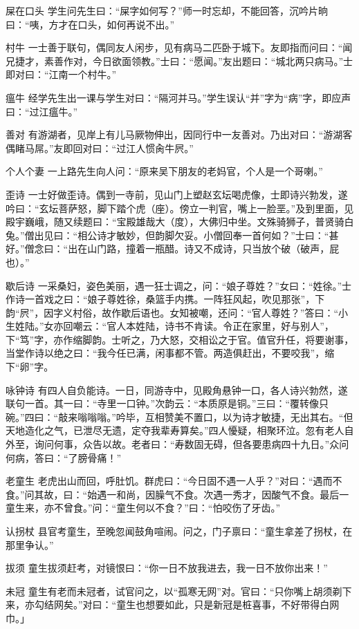 \documentclass[12pt,UTF8]{ctexbook}
\begin{document}
屎在口头
学生问先生曰：“屎字如何写？”师一时忘却，不能回答，沉吟片晌曰：“咦，方才在口头，如何再说不出。”

村牛
一士善于联句，偶同友人闲步，见有病马二匹卧于城下。友即指而问曰：“闻兄捷才，素善作对，今日欲面领教。”士曰：“愿闻。”友出题曰：“城北两只病马。”士即对曰：“江南一个村牛。”

瘟牛
经学先生出一课与学生对曰：“隔河并马。”学生误认“并”字为“病”字，即应声曰：“过江瘟牛。”

善对
有游湖者，见岸上有儿马厥物伸出，因同行中一友善对。乃出对曰：“游湖客偶睹马屌。”友即回对曰：“过江人惯肏牛屄。”

个人个妻
一上路先生向人问：“原来吴下朋友的老妈官，个人是一个哥喇。”

歪诗
一士好做歪诗。偶到一寺前，见山门上塑赵玄坛喝虎像，士即诗兴勃发，遂吟曰：“玄坛菩萨怒，脚下踏个虎（座）。傍立一判官，嘴上一脸垩。”及到里面，见殿宇巍峨，随又续题曰：“宝殿雄哉大（度），大佛归中坐。文殊骑狮子，普贤骑白兔。”僧出见曰：“相公诗才敏妙，但韵脚欠妥。小僧回奉一首何如？”士曰：“甚好。”僧念曰：“出在山门路，撞着一瓶醋。诗又不成诗，只当放个破（破声，屁也）。”

歇后诗
一采桑妇，姿色美丽，遇一狂士调之，问：“娘子尊姓？”女曰：“姓徐。”士作诗一首戏之曰：“娘子尊姓徐，桑篮手内携。一阵狂风起，吹见那张”，下韵“屄”，因字义村俗，故作歇后语也。女知被嘲，还问：“官人尊姓？”答曰：“小生姓陆。”女亦回嘲云：“官人本姓陆，诗书不肯读。令正在家里，好与别人”，下“笃”字，亦作缩脚韵。士听之，乃大怒，交相讼之于官。值官升任，将要谢事，当堂作诗以绝之曰：“我今任已满，闲事都不管。两造俱赶出，不要咬我”，缩下“卵”字。

咏钟诗
有四人自负能诗。一日，同游寺中，见殿角悬钟一口，各人诗兴勃然，遂联句一首。其一曰：“寺里一口钟。”次韵云：“本质原是铜。”三曰：“覆转像只碗。”四曰：“敲来嗡嗡嗡。”吟毕，互相赞美不置口，以为诗才敏捷，无出其右。“但天地造化之气，已泄尽无遗，定夺我辈寿算矣。”四人懮疑，相聚环泣。忽有老人自外至，询问何事，众告以故。老者曰：“寿数固无碍，但各要患病四十九日。”众问何病，答曰：“了膀骨痛！”

老童生
老虎出山而回，呼肚饥。群虎曰：“今日固不遇一人乎？”对曰：“遇而不食。”问其故，曰：“始遇一和尚，因臊气不食。次遇一秀才，因酸气不食。最后一童生来，亦不曾食。”问：“童生何以不食？”曰：“怕咬伤了牙齿。”

认拐杖
县官考童生，至晚忽闻鼓角喧闹。问之，门子禀曰：“童生拿差了拐杖，在那里争认。”

拔须
童生拔须赶考，对镜恨曰：“你一日不放我进去，我一日不放你出来！”

未冠
童生有老而未冠者，试官问之，以“孤寒无网”对。官曰：“只你嘴上胡须剃下来，亦勾结网矣。”对曰：“童生也想要如此，只是新冠是桩喜事，不好带得白网巾。」
\end{document}
